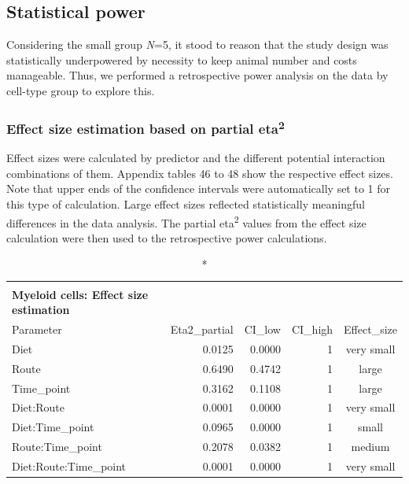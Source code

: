 \documentclass[
  12pt,
  letterpaper,
]{article}
\begin{document}
\subsection{Statistical power}\label{statistical-power-1}

Considering the small group \emph{N}=5, it stood to reason that the study design was statistically underpowered by necessity to keep animal number and costs manageable. Thus, we performed a retrospective power analysis on the data by cell-type group to explore this.

\subsubsection{\texorpdfstring{Effect size estimation based on partial eta\textsuperscript{2}}{Effect size estimation based on partial eta2}}\label{effect-size-estimation-based-on-partial-eta2-1}

Effect sizes were calculated by predictor and the different potential interaction combinations of them. Appendix tables 46 to 48 show the respective effect sizes. Note that upper ends of the confidence intervals were automatically set to 1 for this type of calculation. Large effect sizes reflected statistically meaningful differences in the data analysis. The partial eta\textsuperscript{2} values from the effect size calculation were then used to the retrospective power calculations.

\begingroup
\fontsize{12.0pt}{14.4pt}\selectfont
\begin{longtable}{lrrrc}
\caption*{
{\large \textbf{Appendix Table 46}} \\ 
{\small \textbf{Myeloid cells: Effect size estimation}}
} \\ 
\toprule
Parameter & Eta2\_partial & CI\_low & CI\_high & Effect\_size \\ 
\midrule\addlinespace[2.5pt]
Diet & 0.0125 & 0.0000 & 1 & very small \\ 
Route & 0.6490 & 0.4742 & 1 & large \\ 
Time\_point & 0.3162 & 0.1108 & 1 & large \\ 
Diet:Route & 0.0001 & 0.0000 & 1 & very small \\ 
Diet:Time\_point & 0.0965 & 0.0000 & 1 & small \\ 
Route:Time\_point & 0.2078 & 0.0382 & 1 & medium \\ 
Diet:Route:Time\_point & 0.0001 & 0.0000 & 1 & very small \\ 
\bottomrule
\end{longtable}
\endgroup
\end{document}
